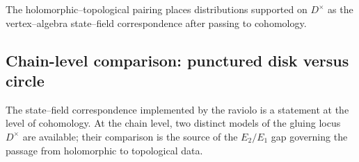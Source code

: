 \begin{remark}
The holomorphic–topological pairing places distributions supported on $D^\times$ as the vertex–algebra state–field correspondence after passing to cohomology.
\end{remark}

\subsection{Chain-level comparison: punctured disk versus circle}
\label{subsec:chain-level-D-vs-S1}

The state--field correspondence implemented by the raviolo is a statement at the level of cohomology.
At the chain level, two distinct models of the gluing locus $D^\times$ are available; their comparison is the source of the $E_2/E_1$ gap governing the passage from holomorphic to topological data.

\label{rem:chain-D-vs-S1}


